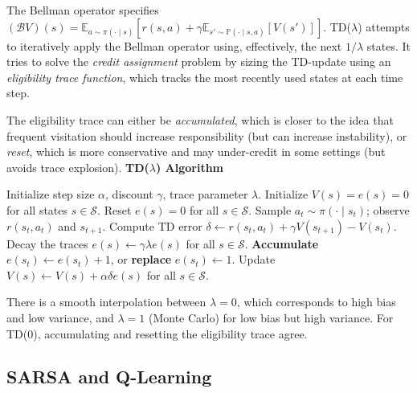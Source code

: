 \documentclass[11pt, letterpaper]{article}
\begin{document}
\begin{concept}
    The Bellman operator specifies \((\mathcal{B}V)(s) = \mathbb{E}_{a \sim \pi(\cdot \mid s)}[r(s, a) + \gamma \mathbb{E}_{s' \sim \mathbb{P}(\cdot \mid s, a)}[V(s')]]\). TD(\(\lambda\)) attempts to iteratively apply the Bellman operator using, effectively, the next \(1 / \lambda\) states. It tries to solve the \textit{credit assignment} problem by sizing the TD-update using an \textit{eligibility trace function}, which tracks the most recently used states at each time step. 

    The eligibility trace can either be \textit{accumulated}, which is closer to the idea that frequent visitation should increase responsibility (but can increase instability), or \textit{reset}, which is more conservative and may under-credit in some settings (but avoids trace explosion). 
    \algline
    \textbf{TD(\(\lambda\)) Algorithm}
    \begin{algorithmic}[1]
    \State Initialize step size \(\alpha\), discount \(\gamma\), trace parameter \(\lambda\). 
    \State Initialize \(V(s) = e(s) = 0\) for all states \(s \in \mathcal{S}\). 
        \State Reset \(e(s) = 0\) for all \(s \in \mathcal{S}\). 
            \State Sample \(a_t \sim \pi(\cdot \mid s_t)\); observe \(r(s_t, a_t)\) and \(s_{t+1}\). 
            \State Compute TD error \(\delta \gets r(s_t, a_t) + \gamma V(s_{t+1}) - V(s_t)\). 
            \State Decay the traces \(e(s) \gets \gamma \lambda e(s)\) for all \(s \in \mathcal{S}\). 
            \State \textbf{Accumulate} \(e(s_t) \gets e(s_t) + 1\), or \textbf{replace} \(e(s_t) \gets 1\). 
            \State Update \(V(s) \gets V(s) + \alpha \delta e(s)\) for all \(s \in \mathcal{S}\). 
        \EndFor
    \EndFor
    \end{algorithmic}
    \algline
\end{concept}

\begin{remark}
    There is a smooth interpolation between \(\lambda=0\), which corresponds to high bias and low variance, and \(\lambda=1\) (Monte Carlo) for low bias but high variance. For TD(\(0\)), accumulating and resetting the eligibility trace agree. 
\end{remark}

\subsection{SARSA and Q-Learning}
\end{document}
